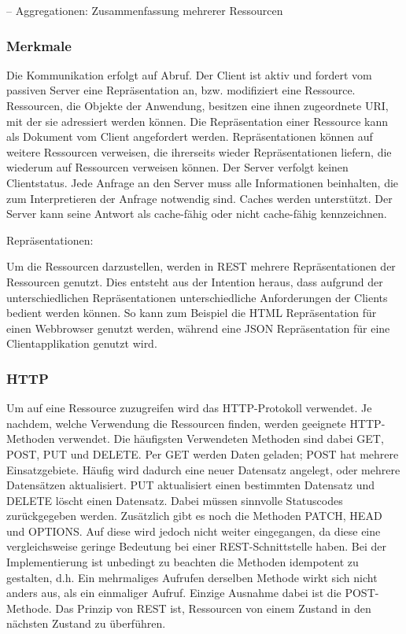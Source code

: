 –	Aggregationen: Zusammenfassung mehrerer Ressourcen

\subsubsection{Merkmale}
\label{sec:RESTMerkmale}

Die Kommunikation erfolgt auf Abruf. Der Client ist aktiv und fordert vom passiven Server eine Repräsentation an, bzw. modifiziert eine Ressource. Ressourcen, die Objekte der Anwendung, besitzen eine ihnen zugeordnete \ac{URI}, mit der sie adressiert werden können. Die Repräsentation einer Ressource kann als Dokument vom Client angefordert werden. Repräsentationen können auf weitere Ressourcen verweisen, die ihrerseits wieder Repräsentationen liefern, die wiederum auf Ressourcen verweisen können. Der Server verfolgt keinen Clientstatus. Jede Anfrage an den Server muss alle Informationen beinhalten, die zum Interpretieren der Anfrage notwendig sind. Caches werden unterstützt. Der Server kann seine Antwort als cache-fähig oder nicht cache-fähig kennzeichnen.

Repräsentationen:

Um die Ressourcen darzustellen, werden in \ac{REST} mehrere Repräsentationen der Ressourcen genutzt. Dies entsteht aus der Intention heraus, dass aufgrund der unterschiedlichen Repräsentationen unterschiedliche Anforderungen der Clients bedient werden können. So kann zum Beispiel die \ac{HTML} Repräsentation für einen Webbrowser genutzt werden, während eine \ac{JSON} Repräsentation für eine Clientapplikation genutzt wird.

\subsubsection{HTTP}
\label{sec:RESTHTTP}


Um auf eine Ressource zuzugreifen wird das \ac{HTTP}-Protokoll verwendet. Je nachdem, welche Verwendung die Ressourcen finden, werden geeignete \ac{HTTP}-Methoden verwendet. Die häufigsten Verwendeten Methoden sind dabei GET, POST, PUT und DELETE. Per GET werden Daten geladen; POST hat mehrere Einsatzgebiete. Häufig wird dadurch eine neuer Datensatz angelegt, oder mehrere Datensätzen aktualisiert. PUT aktualisiert einen bestimmten Datensatz und DELETE löscht einen Datensatz. Dabei müssen sinnvolle Statuscodes zurückgegeben werden. Zusätzlich gibt es noch die Methoden PATCH, HEAD und OPTIONS. Auf diese wird jedoch nicht weiter eingegangen, da diese eine vergleichsweise geringe Bedeutung bei einer \ac{REST}-Schnittstelle haben. Bei der Implementierung ist unbedingt zu beachten die Methoden idempotent zu gestalten, d.h. Ein mehrmaliges Aufrufen derselben Methode wirkt sich nicht anders aus, als ein einmaliger Aufruf. Einzige Ausnahme dabei ist die POST-Methode. Das Prinzip von \ac{REST} ist, Ressourcen von einem Zustand in den nächsten Zustand zu überführen.

